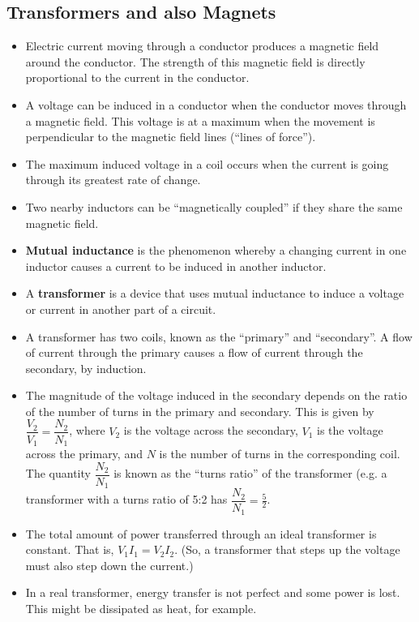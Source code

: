 \documentclass[letterpaper,12pt]{scrartcl}
\begin{document}
\subsection{Transformers and also Magnets}

\begin{itemize}
\item Electric current moving through a conductor produces a magnetic field around the conductor. The strength of this magnetic field is directly proportional to the current in the conductor.
\item A voltage can be induced in a conductor when the conductor moves through a magnetic field. This voltage is at a maximum when the movement is perpendicular to the magnetic field lines (``lines of force'').
\item The maximum induced voltage in a coil occurs when the current is going through its greatest rate of change.
\item Two nearby inductors can be ``magnetically coupled'' if they share the same magnetic field.
\item \textbf{Mutual inductance} is the phenomenon whereby a changing current in one inductor causes a current to be induced in another inductor.
\item A \textbf{transformer} is a device that uses mutual inductance to induce a voltage or current in another part of a circuit.
\item A transformer has two coils, known as the ``primary'' and ``secondary''. A flow of current through the primary causes a flow of current through the secondary, by induction.
\item The magnitude of the voltage induced in the secondary depends on the ratio of the number of turns in the primary and secondary. This is given by $\dfrac{V_2}{V_1} = \dfrac{N_2}{N_1}$,
where $V_2$ is the voltage across the secondary, $V_1$ is the voltage across the primary, and $N$ is the number of turns in the corresponding coil.
The quantity $\dfrac{N_2}{N_1}$ is known as the ``turns ratio'' of the transformer (e.g. a transformer with a turns ratio of 5:2 has $\dfrac{N_2}{N_1} = \frac{5}{2}$.
\item The total amount of power transferred through an ideal transformer is constant. That is, $V_1 I_1 = V_2 I_2$. 
(So, a transformer that steps up the voltage must also step down the current.)
\item In a real transformer, energy transfer is not perfect and some power is lost. This might be dissipated as heat, for example.

\end{itemize}
\end{document}
